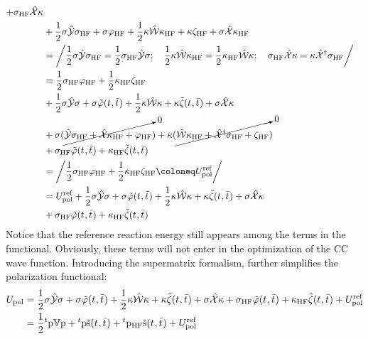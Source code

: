 \begin{equation}
\begin{aligned}
  + \sigma_\mathrm{HF}\bi{X}\kappa \\
&+  \frac{1}{2}\sigma\PCM\sigma_\mathrm{HF}
  + \sigma\esp_\mathrm{HF}
  + \frac{1}{2}\kappa\MM\kappa_\mathrm{HF}
  + \kappa\zeta_\mathrm{HF}
  + \sigma\bi{X}\kappa_\mathrm{HF} \\
&= \left/
  \frac{1}{2}\sigma\PCM\sigma_\mathrm{HF}
  =
  \frac{1}{2}\sigma_\mathrm{HF}\PCM\sigma;\quad
  \frac{1}{2}\kappa\MM\kappa_\mathrm{HF}
  =
  \frac{1}{2}\kappa_\mathrm{HF}\MM\kappa; \quad
  \sigma_\mathrm{HF}\bi{X}\kappa
  =
  \kappa\bi{X}^\dagger\sigma_\mathrm{HF}
  \right/ \\
&=
    \frac{1}{2}\sigma_\mathrm{HF}\esp_\mathrm{HF}
  + \frac{1}{2}\kappa_\mathrm{HF}\zeta_\mathrm{HF} \\
&+  \frac{1}{2}\sigma\PCM\sigma
  + \sigma\tilde{\esp}(\tamp{},\tbar{})
  + \frac{1}{2}\kappa\MM\kappa
  + \kappa\tilde{\zeta}(\tamp{},\tbar{})
  + \sigma\bi{X}\kappa \\
  &+ \sigma(\cancelto{0}{\bi{Y}\sigma_\mathrm{HF} + \bi{X}\kappa_\mathrm{HF} + \esp_\mathrm{HF}})
  + \kappa(\cancelto{0}{\bi{W}\kappa_\mathrm{HF} + \bi{X}^\dagger\sigma_\mathrm{HF} + \zeta_\mathrm{HF}}) \\
&+ \sigma_\mathrm{HF}\tilde{\esp}(\tamp{},\tbar{}) + \kappa_\mathrm{HF}\tilde{\zeta}(\tamp{},\tbar{}) \\
&= \left/
    \frac{1}{2}\sigma_\mathrm{HF}\esp_\mathrm{HF}
  + \frac{1}{2}\kappa_\mathrm{HF}\zeta_\mathrm{HF}
  \coloneq U_\mathrm{pol}^\mathrm{ref}
  \right/ \\
&=
  U_\mathrm{pol}^\mathrm{ref}
  +  \frac{1}{2}\sigma\PCM\sigma
  + \sigma\tilde{\esp}(\tamp{},\tbar{})
  + \frac{1}{2}\kappa\MM\kappa
  + \kappa\tilde{\zeta}(\tamp{},\tbar{})
  + \sigma\bi{X}\kappa \\
&+ \sigma_\mathrm{HF}\tilde{\esp}(\tamp{},\tbar{}) + \kappa_\mathrm{HF}\tilde{\zeta}(\tamp{},\tbar{})
  \end{aligned}
\end{equation}
Notice that the reference reaction energy still appears among the terms
in the functional. Obviously, these terms will not enter in the optimization of
the \acs{CC} wave function.
Introducing the supermatrix formalism, further simplifies the
polarization functional:
\begin{equation}
  \begin{aligned}
  U_\mathrm{pol} &=
    \frac{1}{2}\sigma\hat{\mathcal{Y}}\sigma
    + \sigma\tilde{\varphi}(t_{},\bar{t}_{})
  + \frac{1}{2}\kappa\hat{\mathcal{W}}\kappa
  + \kappa\tilde{\zeta}(t_{},\bar{t}_{})
  + \sigma\hat{\mathcal{X}}\kappa
  + \sigma_\mathrm{HF}\tilde{\varphi}(t_{},\bar{t}_{}) +
  \kappa_\mathrm{HF}\tilde{\zeta}(t_{},\bar{t}_{})
  + U_\mathrm{pol}^\mathrm{ref}
  \\
  &=
  \frac{1}{2}{}^t\mathrm{p}\mathbb{V}\mathrm{p} + {}^t\mathrm{p}\tilde{\mathrm{s}}(t_{},\bar{t}_{})
  + {}^t\mathrm{p}_\mathrm{HF}\tilde{\mathrm{s}}(t_{},\bar{t}_{})
  + U_\mathrm{pol}^\mathrm{ref}
\end{aligned}
\end{equation}

